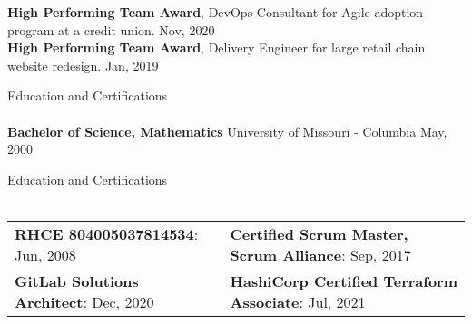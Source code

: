 \documentclass[letterpaper]{article}
\newcommand{\lineunder} {
    \vspace*{-8pt} \\
    \hspace*{-18pt} \hrulefill \\
}
\newcommand{\header} [1] {
    {\hspace*{-18pt}\vspace*{6pt} #1}
    \vspace*{-6pt} \lineunder
}
\begin{document}
\textbf{High Performing Team Award}, DevOps Consultant for Agile adoption
program at a credit union. \hfill Nov, 2020\\

\textbf{High Performing Team Award}, Delivery Engineer for large retail chain
website redesign. \hfill Jan, 2019\\
\vspace*{2mm}

\header{Education and Certifications}
\textbf{Bachelor of Science, Mathematics} \hfill University of Missouri -
Columbia \hfill  May, 2000\\
\vspace{2mm}

\header{Education and Certifications}
\begin{tabular}{ l l }
  \textbf{RHCE 804005037814534}: Jun, 2008       & \textbf{Certified Scrum Master, Scrum Alliance}: Sep, 2017 \\
  \textbf{GitLab Solutions Architect}: Dec, 2020 & \textbf{HashiCorp Certified Terraform Associate}: Jul, 2021 \\
\end{tabular}
\vspace{2mm}
\end{document}
